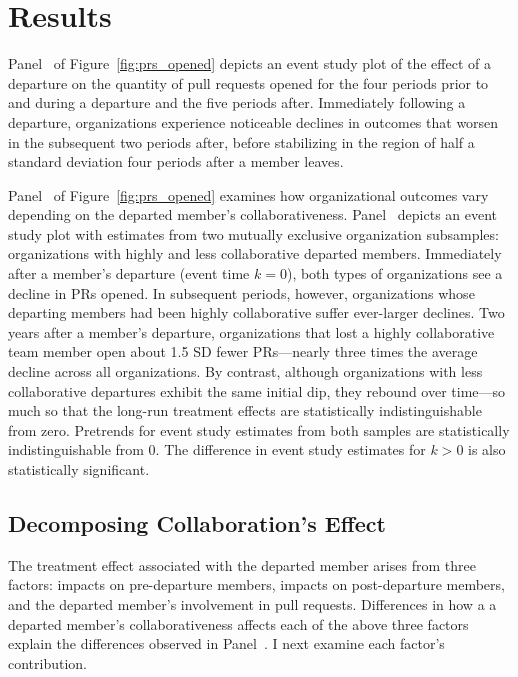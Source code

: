 \documentclass[12pt,notitlepage]{article}
\begin{document}
\section{Results} \label{sec:result}
Panel~ of Figure~\ref{fig:prs_opened} depicts an event study plot of the effect of a departure on the quantity of pull requests opened for the four periods prior to and during a departure and the five periods after. Immediately following a departure, organizations experience noticeable declines in outcomes that worsen in the subsequent two periods after, before stabilizing in the region of half a standard deviation four periods after a member leaves. 

Panel~ of Figure~\ref{fig:prs_opened} examines how organizational outcomes vary depending on the departed member's collaborativeness. Panel~ depicts an event study plot with estimates from two mutually exclusive organization subsamples: organizations with highly and less collaborative departed members. Immediately after a member’s departure (event time $k=0$), both types of organizations see a decline in PRs opened. In subsequent periods, however, organizations whose departing members had been highly collaborative suffer ever-larger declines. Two years after a member’s departure, organizations that lost a highly collaborative team member open about 1.5 SD fewer PRs—nearly three times the average decline across all organizations. By contrast, although organizations with less collaborative departures exhibit the same initial dip, they rebound over time—so much so that the long-run treatment effects are statistically indistinguishable from zero. Pretrends for event study estimates from both samples are statistically indistinguishable from 0. The difference in event study estimates for $k>0$ is also statistically significant. 

\subsection{Decomposing Collaboration's Effect}
The treatment effect associated with the departed member arises from three factors: impacts on pre-departure members, impacts on post-departure members, and the departed member’s involvement in pull requests. Differences in how a a departed member's collaborativeness affects each of the above three factors explain the differences observed in Panel~. I next examine each factor’s contribution.
\end{document}
